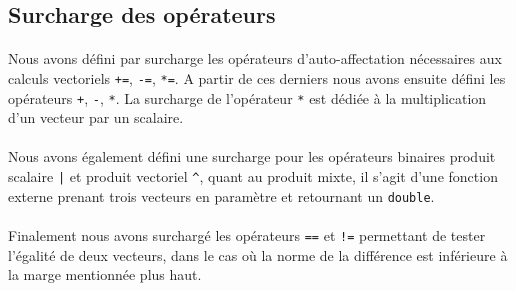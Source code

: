 \documentclass[12pt, letterpaper, twoside]{article}
\begin{document}
\subsection{Surcharge des opérateurs}
\paragraph{}
Nous avons défini par surcharge les opérateurs d'auto-affectation nécessaires aux calculs vectoriels \texttt{+=}, \texttt{-=}, \texttt{*=}. A partir de ces derniers nous avons ensuite défini les opérateurs \texttt{+}, \texttt{-}, \texttt{*}. La surcharge de l'opérateur \texttt{*} est dédiée à la multiplication d'un vecteur par un scalaire.
\paragraph{}
Nous avons également défini une surcharge pour les opérateurs binaires produit scalaire \texttt{|} et produit vectoriel \texttt{\^}, quant au produit mixte, il s'agit d'une fonction externe prenant trois vecteurs en paramètre et retournant un \texttt{double}.
\paragraph{}
Finalement nous avons surchargé les opérateurs \texttt{==} et \texttt{!=} permettant de tester l'égalité de deux vecteurs, dans le cas où la norme de la différence est inférieure à la marge mentionnée plus haut.
\end{document}
